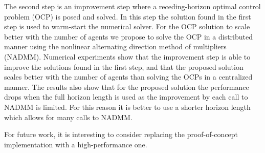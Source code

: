 \documentclass[letterpaper, 10 pt, conference]{ieeeconf}  %
\begin{document}
The second step is an improvement step where a receding-horizon optimal control problem (OCP) is posed and solved. In this step the solution found in the first step is used to warm-start the numerical solver. For the OCP solution to scale better with the number of agents we propose to solve the OCP in a distributed manner using the nonlinear alternating direction method of multipliers (NADMM). Numerical experiments show that the improvement step is able to improve the solutions found in the first step, and that the proposed solution scales better with the number of agents than solving the OCPs in a centralized manner. The results also show that for the proposed solution the performance drops when the full horizon length is used as the improvement by each call to NADMM is limited. For this reason it is better to use a shorter horizon length which allows for many calls to NADMM.

For future work, it is interesting to consider replacing the proof-of-concept implementation with a high-performance one.





 
\end{document}
